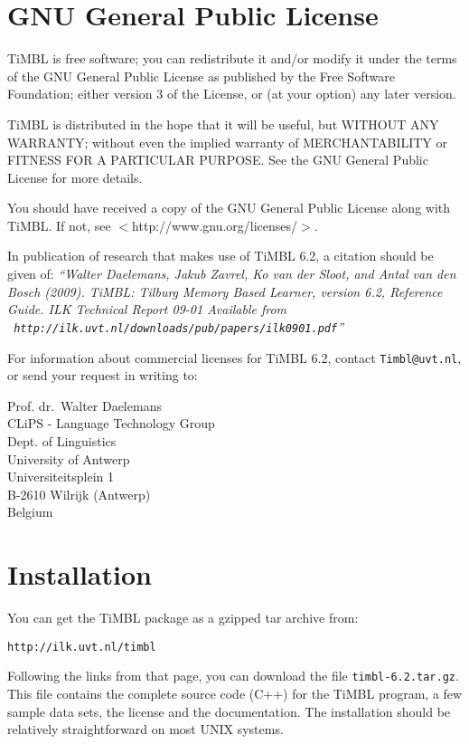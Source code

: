\documentclass{report}
\begin{document}
\chapter{GNU General Public License}
\label{license}

TiMBL is free software; you can redistribute it and/or modify it under the terms of the GNU General Public License as published by the Free Software Foundation; either version 3 of the License, or (at your option) any later version.

TiMBL is distributed in the hope that it will be useful, but WITHOUT ANY WARRANTY; without even the implied warranty of MERCHANTABILITY or FITNESS FOR A PARTICULAR PURPOSE.  See the GNU General Public License for more details.

You should have received a copy of the GNU General Public License along with TiMBL.  If not, see $<$http://www.gnu.org/licenses/$>$.

In publication of research that makes use of TiMBL 6.2, a citation should be given of: {\em ``Walter Daelemans, Jakub Zavrel, Ko van der
  Sloot, and Antal van den Bosch (2009). TiMBL: Tilburg Memory Based
  Learner, version 6.2, Reference Guide. ILK Technical Report 09-01
  Available from \\ {\tt
    http://ilk.uvt.nl/downloads/pub/papers/ilk0901.pdf}''}

For information about commercial licenses for TiMBL 6.2,
contact {\tt Timbl@uvt.nl}, or send your request in writing to:

Prof. dr.~Walter Daelemans\\
CLiPS - Language Technology Group\\
Dept. of Linguistics \\
University of Antwerp\\
Universiteitsplein 1\\
B-2610 Wilrijk (Antwerp)\\
Belgium

\pagestyle{headings}

\chapter{Installation}
\vspace{-1cm}
You can get the TiMBL package as a gzipped tar archive from:

{\tt http://ilk.uvt.nl/timbl}

Following the links from that page, you can download the file {\tt timbl-6.2.tar.gz}. This file contains the complete source code (C++) for the TiMBL program, a few sample data sets, the license and the documentation. The installation should be relatively straightforward on most UNIX systems.
\end{document}
